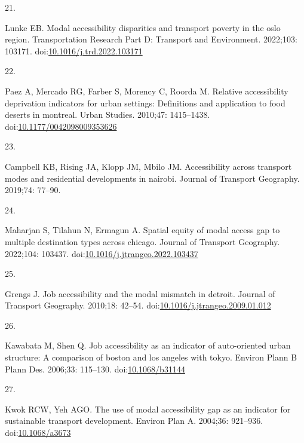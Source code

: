\documentclass[10pt,letterpaper]{article}
\newlength{\cslhangindent}
\newlength{\csllabelwidth}
\newlength{\cslentryspacingunit} %
\newenvironment{CSLReferences}[2] %
 {%
  \setlength{\parindent}{0pt}
  \ifodd #1
  \let\oldpar\par
  \def\par{\hangindent=\cslhangindent\oldpar}
  \fi
  \setlength{\parskip}{#2\cslentryspacingunit}
 }%
 {}
\newcommand{\CSLLeftMargin}[1]{\parbox[t]{\csllabelwidth}{#1}}
\newcommand{\CSLRightInline}[1]{\parbox[t]{\linewidth - \csllabelwidth}{#1}\break}
\begin{document}
\begin{CSLReferences}{0}{0}
\leavevmode{}%
\CSLLeftMargin{21. }%
\CSLRightInline{Lunke EB. Modal accessibility disparities and transport
poverty in the oslo region. Transportation Research Part D: Transport
and Environment. 2022;103: 103171.
doi:\href{https://doi.org/10.1016/j.trd.2022.103171}{10.1016/j.trd.2022.103171}}

\leavevmode{}%
\CSLLeftMargin{22. }%
\CSLRightInline{Paez A, Mercado RG, Farber S, Morency C, Roorda M.
Relative accessibility deprivation indicators for urban settings:
Definitions and application to food deserts in montreal. Urban Studies.
2010;47: 1415--1438.
doi:\href{https://doi.org/10.1177/0042098009353626}{10.1177/0042098009353626}}

\leavevmode{}%
\CSLLeftMargin{23. }%
\CSLRightInline{Campbell KB, Rising JA, Klopp JM, Mbilo JM.
Accessibility across transport modes and residential developments in
nairobi. Journal of Transport Geography. 2019;74: 77--90. }

\leavevmode{}%
\CSLLeftMargin{24. }%
\CSLRightInline{Maharjan S, Tilahun N, Ermagun A. Spatial equity of
modal access gap to multiple destination types across chicago. Journal
of Transport Geography. 2022;104: 103437.
doi:\href{https://doi.org/10.1016/j.jtrangeo.2022.103437}{10.1016/j.jtrangeo.2022.103437}}

\leavevmode{}%
\CSLLeftMargin{25. }%
\CSLRightInline{Grengs J. Job accessibility and the modal mismatch in
detroit. Journal of Transport Geography. 2010;18: 42--54.
doi:\href{https://doi.org/10.1016/j.jtrangeo.2009.01.012}{10.1016/j.jtrangeo.2009.01.012}}

\leavevmode{}%
\CSLLeftMargin{26. }%
\CSLRightInline{Kawabata M, Shen Q. Job accessibility as an indicator of
auto-oriented urban structure: A comparison of boston and los angeles
with tokyo. Environ Plann B Plann Des. 2006;33: 115--130.
doi:\href{https://doi.org/10.1068/b31144}{10.1068/b31144}}

\leavevmode{}%
\CSLLeftMargin{27. }%
\CSLRightInline{Kwok RCW, Yeh AGO. The use of modal accessibility gap as
an indicator for sustainable transport development. Environ Plan A.
2004;36: 921--936.
doi:\href{https://doi.org/10.1068/a3673}{10.1068/a3673}}


\end{CSLReferences}
\end{document}
